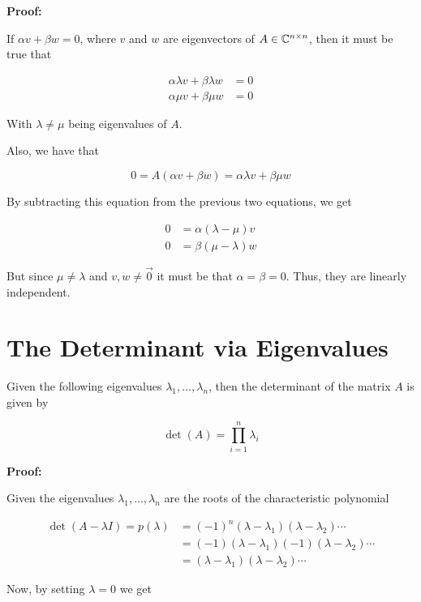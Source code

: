 \textbf{Proof:}

If \(\alpha v + \beta w = 0\), where \(v\) and \(w\) are eigenvectors of \(A \in \mathbb{C}^{n \times n}\), then it must be true that 

\begin{align*}
    \alpha \lambda v + \beta \lambda w &= 0 \\ 
    \alpha \mu v + \beta \mu w &= 0
\end{align*}

With \(\lambda \ne \mu\) being eigenvalues of \(A\).

Also, we have that 

\[
    0 = A(\alpha v + \beta w) = \alpha \lambda v + \beta \mu w
\]

By subtracting this equation from the previous two equations, we get

\begin{align*}
    0 &= \alpha (\lambda - \mu)v \\
    0 &= \beta (\mu - \lambda)w
\end{align*}

But since \(\mu \ne \lambda\) and \(v, w \ne \vec{0}\) it must be that \(\alpha = \beta = 0\). Thus, 
they are linearly independent.

\QED

\section{The Determinant via Eigenvalues}

Given the following eigenvalues \(\lambda_1, \dots, \lambda_n\), then the 
determinant of the matrix \(A\) is given by 

\[
    \det(A) = \prod_{i = 1}^{n} \lambda_i
\]

\textbf{Proof:}

Given the eigenvalues \(\lambda_1, \dots, \lambda_n\) are the roots of the characteristic polynomial

\begin{align*}
    \det(A - \lambda I) = p (\lambda) &= (-1)^{n}(\lambda - \lambda_1)(\lambda - \lambda_2)\cdots\\
                                      &= (-1)(\lambda - \lambda_1)(-1)(\lambda - \lambda_2)\cdots\\     
                                      &= (\lambda - \lambda_1)(\lambda - \lambda_2)\cdots                       
\end{align*}

Now, by setting \(\lambda = 0\) we get 

